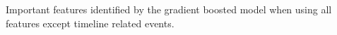 Important features identified by the gradient boosted model when using all features except timeline related events.
\label{fig:RelImpNoTimeVals}